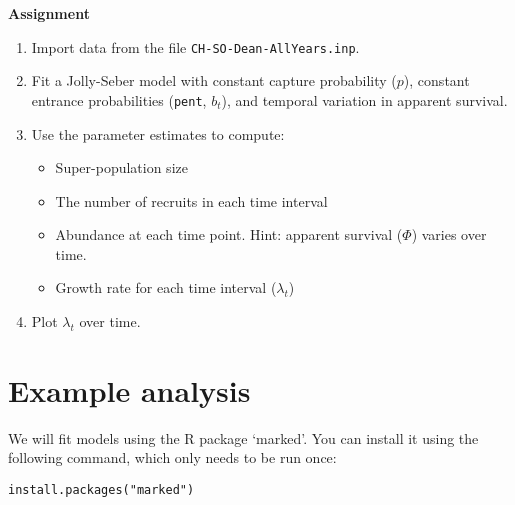 \documentclass[12pt]{article}\usepackage[]{graphicx}\usepackage[]{xcolor}
\makeatletter
\newcommand{\hlsng}[1]{\textcolor[rgb]{0.749,0.012,0.012}{#1}}%
\newcommand{\hldef}[1]{\textcolor[rgb]{0,0,0}{#1}}%
\newcommand{\hlkwd}[1]{\textcolor[rgb]{0.004,0.004,0.506}{#1}}%
\newenvironment{kframe}{%
 \def\at@end@of@kframe{}%
 \ifinner\ifhmode%
  \def\at@end@of@kframe{\end{minipage}}%
  \begin{minipage}{\columnwidth}%
 \fi\fi%
 \def\FrameCommand##1{\hskip\@totalleftmargin \hskip-\fboxsep
 \colorbox{shadecolor}{##1}\hskip-\fboxsep
     \hskip-\linewidth \hskip-\@totalleftmargin \hskip\columnwidth}%
 \MakeFramed {\advance\hsize-\width
   \@totalleftmargin\z@ \linewidth\hsize
   \@setminipage}}%
 {\par\unskip\endMakeFramed%
 \at@end@of@kframe}
\newenvironment{knitrout}{}{} %
\makeatother
\begin{document}

{\bf Assignment}

\begin{enumerate}
  \item Import data from the file \texttt{CH-SO-Dean-AllYears.inp}.
  \item Fit a Jolly-Seber model with constant capture probability
    ($p$), constant entrance probabilities (\texttt{pent}, $b_t$), and
    temporal variation in apparent survival.
  \item Use the parameter estimates to compute:
    \begin{itemize}
      \item Super-population size
      \item The number of recruits in each time interval
      \item Abundance at each time point. Hint: apparent survival
        ($\Phi$) varies over time.
      \item Growth rate for each time interval ($\lambda_t$)
    \end{itemize}
  \item Plot $\lambda_t$ over time.
\end{enumerate}


\clearpage

\section*{Example analysis}




We will fit models using the R package `marked'. You can install it
using the following command, which only needs to be run once: 

\begin{knitrout}
\color{fgcolor}\begin{kframe}
\begin{alltt}
\hlkwd{install.packages}\hldef{(}\hlsng{"marked"}\hldef{)}
\end{alltt}
\end{kframe}
\end{knitrout}
\end{document}
